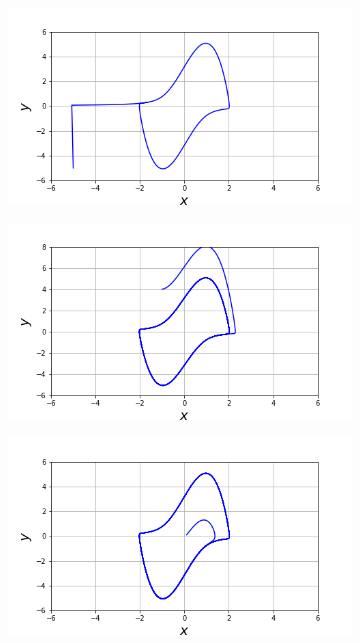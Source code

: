 \documentclass{article}
\begin{document}
\begin{figure}[h!]
  \centering
  \begin{subfigure}[b]{0.45\linewidth}
    \includegraphics[width=\linewidth]{EspacioFase1.png}
     \caption{}
  \end{subfigure}
  \begin{subfigure}[b]{0.45\linewidth}
    \includegraphics[width=\linewidth]{EspacioFase3.png}
    \caption{}
  \end{subfigure}
  \begin{subfigure}[b]{0.45\linewidth}
    \includegraphics[width=\linewidth]{EspacioFase4.png}

\end{subfigure}
\end{figure}
\end{document}
